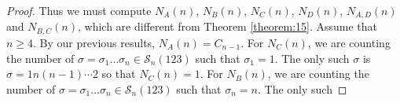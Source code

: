 \documentclass[
final,nomarks
]{dmtcs-episciences}
\newcommand{\tref}[1]{Theorem \ref{theorem:#1}}
\newcommand{\Sn}[1]{\mathcal{S}_{#1}}
\begin{document}
\begin{proof}
	Thus we must compute \begin{math}N_A(n)\end{math}, \begin{math}N_{B}(n)\end{math}, \begin{math}N_{C}(n)\end{math}, \begin{math}N_{D}(n)\end{math}, \begin{math}N_{A,D}(n)\end{math} and \begin{math}N_{B,C}(n)\end{math}, which are different from \tref{15}. Assume that \begin{math}n \geq 4\end{math}. 
	By our previous results, \begin{math}N_A(n)=C_{n-1}\end{math}. For \begin{math}N_{C}(n)\end{math}, we are counting the number of \begin{math}\sigma = \sigma_1 \ldots \sigma_n \in \Sn{n}(123)\end{math} such that \begin{math}\sigma_1 =1\end{math}. The only such 
	\begin{math}\sigma\end{math} is \begin{math}\sigma=1n(n-1)\cdots 2\end{math} so that \begin{math}N_{C}(n)=1\end{math}. For \begin{math}N_{B}(n)\end{math}, we are counting the number of \begin{math}\sigma = \sigma_1 \ldots \sigma_n \in \Sn{n}(123)\end{math} such that \begin{math}\sigma_n =n\end{math}. The only such 

\end{proof}
\end{document}
